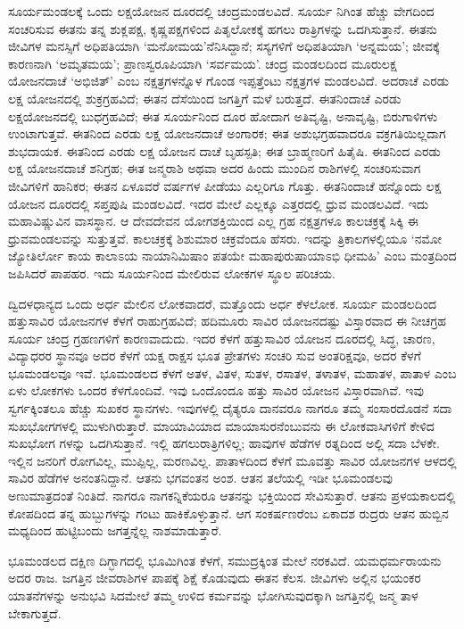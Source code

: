 ಸೂರ್ಯಮಂಡಲಕ್ಕೆ ಒಂದು ಲಕ್ಷಯೋಜನ ದೂರದಲ್ಲಿ ಚಂದ್ರಮಂಡಲವಿದೆ. ಸೂರ್ಯ ನಿಗಿಂತ ಹೆಚ್ಚು ವೇಗದಿಂದ ಸಂಚರಿಸುವ ಈತನು ತನ್ನ ಶುಕ್ಲಪಕ್ಷ, ಕೃಷ್ಣಪಕ್ಷಗಳಿಂದ ಪಿತೃಲೋಕಕ್ಕೆ ಹಗಲು ರಾತ್ರಿಗಳನ್ನು ಒದಗಿಸುತ್ತಾನೆ. ಈತನು ಜೀವಿಗಳ ಮನಸ್ಸಿಗೆ ಅಧಿಪತಿಯಾಗಿ ‘ಮನೋಮಯ’ನೆನಿಸಿದ್ದಾನೆ; ಸಸ್ಯಗಳಿಗೆ ಅಧಿಪತಿಯಾಗಿ ‘ಅನ್ನಮಯ’; ಜೀವಕ್ಕೆ ಕಾರಣನಾಗಿ ‘ಅಮೃತಮಯ’; ಪ್ರಾಣಸ್ವರೂಪಿಯಾಗಿ ‘ಸರ್ವಮಯ’. ಚಂದ್ರ ಮಂಡಲದಿಂದ ಮೂರುಲಕ್ಷ ಯೋಜನದಾಚೆ ‘ಅಭಿಜಿತ್​’ ಎಂಬ ನಕ್ಷತ್ರಗಳನ್ನೊಳ ಗೊಂಡ ಇಪ್ಪತ್ತೆಂಟು ನಕ್ಷತ್ರಗಳ ಮಂಡಲವಿದೆ. ಅದರಾಚೆ ಎರಡು ಲಕ್ಷ ಯೋಜನದಲ್ಲಿ ಶುಕ್ರಗ್ರಹವಿದೆ; ಈತನ ದೆಸೆಯಿಂದ ಜಗತ್ತಿಗೆ ಮಳೆ ಬರುತ್ತದೆ. ಈತನಿಂದಾಚೆ ಎರಡು ಲಕ್ಷಯೋಜನದಲ್ಲಿ ಬುಧಗ್ರಹವಿದೆ; ಈತ ಸೂರ್ಯನಿಂದ ದೂರ ಹೋದಾಗ ಅತಿವೃಷ್ಟಿ, ಅನಾವೃಷ್ಟಿ, ಬಿರುಗಾಳಿಗಳು ಉಂಟಾಗುತ್ತವೆ. ಈತನಿಂದ ಎರಡು ಲಕ್ಷ ಯೋಜನದಾಚೆ ಅಂಗಾರಕ; ಈತ ಅಶುಭಗ್ರಹವಾದರೂ ವಕ್ರಗತಿಯಿಲ್ಲದಾಗ ಶುಭದಾಯಕ. ಈತನಿಂದ ಎರಡು ಲಕ್ಷ ಯೋಜನ ದಾಚೆ ಬೃಹಸ್ಪತಿ; ಈತ ಬ್ರಾಹ್ಮಣರಿಗೆ ಹಿತೈಷಿ. ಈತನಿಂದ ಎರಡು ಲಕ್ಷ ಯೋಜನದಾಚೆ ಶನಿಗ್ರಹ; ಈತ ಜನ್ಮರಾಶಿ ಅಥವಾ ಅದರ ಹಿಂದು ಮುಂದಿನ ರಾಶಿಗಳಲ್ಲಿ ಸಂಚರಿಸುವಾಗ ಜೀವಿಗಳಿಗೆ ಹಾನಿಕರ; ಈತನ ಏಳೂವರೆ ವರ್ಷಗಳ ಪೀಡೆಯು ಎಲ್ಲರಿಗೂ ಗೊತ್ತು. ಈತನಿಂದಾಚೆ ಹನ್ನೊಂದು ಲಕ್ಷ ಯೋಜನ ದೂರದಲ್ಲಿ ಸಪ್ತಪುಷಿ ಮಂಡಲವಿದೆ. ಇದರ ಮೇಲೆ ಎಲ್ಲಕ್ಕೂ ಎತ್ತರದಲ್ಲಿ ಧ್ರುವ ಮಂಡಲವಿದೆ. ಇದು ಮಹಾವಿಷ್ಣುವಿನ ವಾಸಸ್ಥಾನ. ಆ ದೇವದೇವನ ಯೋಗಶಕ್ತಿಯಿಂದ ಎಲ್ಲ ಗ್ರಹ ನಕ್ಷತ್ರಗಳೂ ಕಾಲಚಕ್ರಕ್ಕೆ ಸಿಕ್ಕಿ ಈ ಧ್ರುವಮಂಡಲವನ್ನು ಸುತ್ತುತ್ತವೆ. ಕಾಲಚಕ್ರಕ್ಕೆ ಶಿಶುಮಾರ ಚಕ್ರವೆಂದೂ ಹೆಸರು. ಇದನ್ನು ತ್ರಿಕಾಲಗಳಲ್ಲಿಯೂ ‘ನಮೋ ಜ್ಯೋತಿರ್ಲೋ ಕಾಯ ಕಾಲಾಽಯ ನಾಯಾನಿಮಿಷಾಂ ಪತಯೇ ಮಹಾಪುರುಷಾಯಾಽಭಿ ಧೀಮಹಿ’ ಎಂಬ ಮಂತ್ರದಿಂದ ಜಪಿಸಿದರೆ ಪಾಪಹರ. ಇದು ಸೂರ್ಯನಿಂದ ಮೇಲಿರುವ ಲೋಕಗಳ ಸ್ಥೂಲ ಪರಿಚಯ.

ದ್ವಿದಳಧಾನ್ಯದ ಒಂದು ಅರ್ಧ ಮೇಲಿನ ಲೋಕವಾದರೆ, ಮತ್ತೊಂದು ಅರ್ಧ ಕೆಳಲೋಕ. ಸೂರ್ಯ ಮಂಡಲದಿಂದ ಹತ್ತುಸಾವಿರ ಯೋಜನಗಳ ಕೆಳಗೆ ರಾಹುಗ್ರಹವಿದೆ; ಹದಿಮೂರು ಸಾವಿರ ಯೋಜನದಷ್ಟು ವಿಸ್ತಾರವಾದ ಈ ನೀಚಗ್ರಹ ಸೂರ್ಯ ಚಂದ್ರ ಗ್ರಹಣಗಳಿಗೆ ಕಾರಣವಾದುದು. ಇದರ ಕೆಳಗೆ ಹತ್ತುಸಾವಿರ ಯೋಜನ ದೂರದಲ್ಲಿ ಸಿದ್ಧ, ಚಾರಣ, ವಿದ್ಯಾಧರರ ಸ್ಥಾನವೂ ಅದರ ಕೆಳಗೆ ಯಕ್ಷ ರಾಕ್ಷಸ ಭೂತ ಪ್ರೇತಗಳು ಸಂಚರಿ ಸುವ ಅಂತರಿಕ್ಷವೂ, ಅದರ ಕೆಳಗೆ ಭೂಮಂಡಲವೂ ಇವೆ. ಭೂಮಂಡಲದ ಕೆಳಗೆ ಅತಳ, ವಿತಳ, ಸುತಳ, ರಸಾತಳ, ತಳಾತಳ, ಮಹಾತಳ, ಪಾತಾಳ ಎಂಬ ಏಳು ಲೋಕಗಳು ಒಂದರ ಕೆಳಗೊಂದಿವೆ. ಇವು ಒಂದೊಂದೂ ಹತ್ತು ಸಾವಿರ ಯೋಜನ ವಿಸ್ತಾರವಾಗಿವೆ. ಇವು ಸ್ವರ್ಗಕ್ಕಿಂತಲೂ ಹೆಚ್ಚು ಸುಖಕರ ಸ್ಥಾನಗಳು. ಇವುಗಳಲ್ಲಿ ದೈತ್ಯರೂ ದಾನವರೂ ನಾಗರೂ ತಮ್ಮ ಸಂಸಾರದೊಡನೆ ಸದಾ ಸುಖಭೋಗಗಳಲ್ಲಿ ಮುಳುಗಿರುತ್ತಾರೆ. ಮಾಯಾವಿಯಾದ ಮಾಯಾಸುರನೆಂಬುವನು ಈ ಲೋಕವಾಸಿಗಳಿಗೆ ಕೇಳಿದ ಸುಖಭೋಗ ಗಳನ್ನು ಒದಗಿಸುತ್ತಾನೆ. ಇಲ್ಲಿ ಹಗಲುರಾತ್ರಿಗಳಿಲ್ಲ; ಹಾವುಗಳ ಹೆಡೆಗಳ ರತ್ನದಿಂದ ಅಲ್ಲಿ ಸದಾ ಬೆಳಕೇ. ಇಲ್ಲಿನ ಜನರಿಗೆ ರೋಗವಿಲ್ಲ, ಮುಪ್ಪಿಲ್ಲ, ಮರಣವಿಲ್ಲ. ಪಾತಾಳದಿಂದ ಕೆಳಗೆ ಮೂವತ್ತು ಸಾವಿರ ಯೋಜನಗಳ ಆಳದಲ್ಲಿ ಸಾವಿರ ಹೆಡೆಗಳ ಅನಂತನಿದ್ದಾನೆ. ಆತನು ಭಗವಂತನ ಅಂಶ. ಆತನ ತಲೆಯಲ್ಲಿ ಇಡೀ ಭೂಮಂಡಲವು ಅಣುಮಾತ್ರದಂತೆ ನಿಂತಿದೆ. ನಾಗರೂ ನಾಗಕನ್ನಿಕೆಯರೂ ಆತನನ್ನು ಭಕ್ತಿಯಿಂದ ಸೇವಿಸುತ್ತಾರೆ. ಆತನು ಪ್ರಳಯಕಾಲದಲ್ಲಿ ಕೋಪದಿಂದ ತನ್ನ ಹುಬ್ಬುಗಳನ್ನು ಗಂಟು ಹಾಕಿಕೊಳ್ಳುತ್ತಾನೆ. ಆಗ ಸಂಕರ್ಷಣರೆಂಬ ಏಕಾದಶ ರುದ್ರರು ಆತನ ಹುಬ್ಬಿನ ಮಧ್ಯದಿಂದ ಹುಟ್ಟಿಬಂದು ಜಗತ್ತನ್ನೆಲ್ಲ ನಾಶಮಾಡುತ್ತಾರೆ.

ಭೂಮಂಡಲದ ದಕ್ಷಿಣ ದಿಗ್ಭಾಗದಲ್ಲಿ ಭೂಮಿಗಿಂತ ಕೆಳಗೆ, ಸಮುದ್ರಕ್ಕಿಂತ ಮೇಲೆ ನರಕವಿದೆ. ಯಮಧರ್ಮರಾಯನು ಅದರ ರಾಜ. ಜಗತ್ತಿನ ಜೀವರಾಶಿಗಳ ಪಾಪಕ್ಕೆ ಶಿಕ್ಷೆ ಕೊಡುವುದು ಈತನ ಕೆಲಸ. ಜೀವಿಗಳು ಅಲ್ಲಿನ ಭಯಂಕರ ಯಾತನೆಗಳನ್ನು ಅನುಭವಿ ಸಿದಮೇಲೆ ತಮ್ಮ ಉಳಿದ ಕರ್ಮವನ್ನು ಭೋಗಿಸುವುದಕ್ಕಾಗಿ ಜಗತ್ತಿನಲ್ಲಿ ಜನ್ಮ ತಾಳ ಬೇಕಾಗುತ್ತದೆ. 

